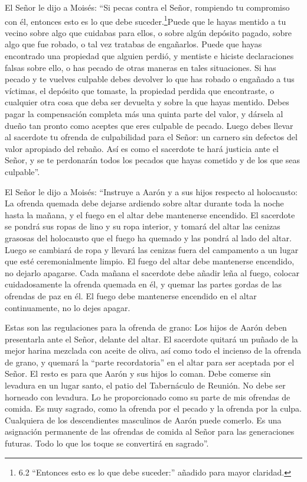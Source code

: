  El Señor le dijo a Moisés:  ``Si pecas contra
el Señor, rompiendo tu compromiso con él, entonces esto es lo que debe
suceder.\footnote{6.2 ``Entonces esto es lo que debe suceder:'' añadido
  para mayor claridad.}Puede que le hayas mentido a tu vecino sobre algo
que cuidabas para ellos, o sobre algún depósito pagado, sobre algo que
fue robado, o tal vez tratabas de engañarlos.  Puede que
hayas encontrado una propiedad que alguien perdió, y mentiste e hiciste
declaraciones falsas sobre ello, o has pecado de otras maneras en tales
situaciones.  Si has pecado y te vuelves culpable debes
devolver lo que has robado o engañado a tus víctimas, el depósito que
tomaste, la propiedad perdida que encontraste,  o cualquier
otra cosa que deba ser devuelta y sobre la que hayas mentido. Debes
pagar la compensación completa más una quinta parte del valor, y dársela
al dueño tan pronto como aceptes que eres culpable de pecado.
 Luego debes llevar al sacerdote tu ofrenda de culpabilidad
para el Señor: un carnero sin defectos del valor apropiado del rebaño.
 Así es como el sacerdote te hará justicia ante el Señor, y
se te perdonarán todos los pecados que hayas cometido y de los que seas
culpable''.

 El Señor le dijo a Moisés:  ``Instruye a Aarón
y a sus hijos respecto al holocausto: La ofrenda quemada debe dejarse
ardiendo sobre altar durante toda la noche hasta la mañana, y el fuego
en el altar debe mantenerse encendido.  El sacerdote se
pondrá sus ropas de lino y su ropa interior, y tomará del altar las
cenizas grasosas del holocausto que el fuego ha quemado y las pondrá al
lado del altar.  Luego se cambiará de ropa y llevará las
cenizas fuera del campamento a un lugar que esté ceremonialmente limpio.
 El fuego del altar debe mantenerse encendido, no dejarlo
apagarse. Cada mañana el sacerdote debe añadir leña al fuego, colocar
cuidadosamente la ofrenda quemada en él, y quemar las partes gordas de
las ofrendas de paz en él.  El fuego debe mantenerse
encendido en el altar continuamente, no lo dejes apagar.

 Estas son las regulaciones para la ofrenda de grano: Los
hijos de Aarón deben presentarla ante el Señor, delante del altar.
 El sacerdote quitará un puñado de la mejor harina mezclada
con aceite de oliva, así como todo el incienso de la ofrenda de grano, y
quemará la ``parte recordatoria'' en el altar para ser aceptada por el
Señor.  El resto es para que Aarón y sus hijos lo coman.
Debe comerse sin levadura en un lugar santo, el patio del Tabernáculo de
Reunión.  No debe ser horneado con levadura. Lo he
proporcionado como su parte de mis ofrendas de comida. Es muy sagrado,
como la ofrenda por el pecado y la ofrenda por la culpa. 
Cualquiera de los descendientes masculinos de Aarón puede comerlo. Es
una asignación permanente de las ofrendas de comida al Señor para las
generaciones futuras. Todo lo que los toque se convertirá en sagrado''.

